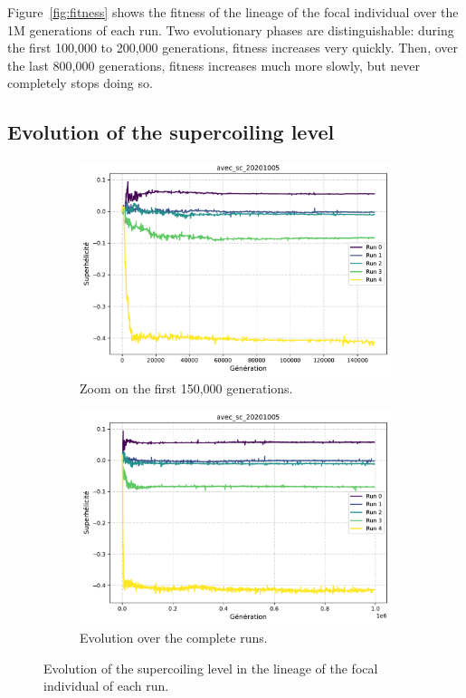 Figure~\ref{fig:fitness} shows the fitness of the lineage of the focal individual over the 1M generations of each run.
Two evolutionary phases are distinguishable: during the first 100,000 to 200,000 generations, fitness increases very quickly.
Then, over the last 800,000 generations, fitness increases much more slowly, but never completely stops doing so.


\subsection{Evolution of the supercoiling level}

\begin{figure}[!h]
  \centering
  \begin{subfigure}[b]{0.49\textwidth}
    \includegraphics[width=\textwidth]{aevol/images/superhelicite_agrege_zoom.pdf}
    \caption{Zoom on the first 150,000 generations.}
    \label{fig:sc_zoom}
  \end{subfigure}
  \begin{subfigure}[b]{0.49\textwidth}
    \includegraphics[width=\textwidth]{aevol/images/superhelicite_agrege.pdf}
    \caption{Evolution over the complete runs.}
    \label{fig:sc_all}
  \end{subfigure}
  \caption{Evolution of the supercoiling level in the lineage of the focal individual of each run.}
  \label{fig:sc}
\end{figure}

